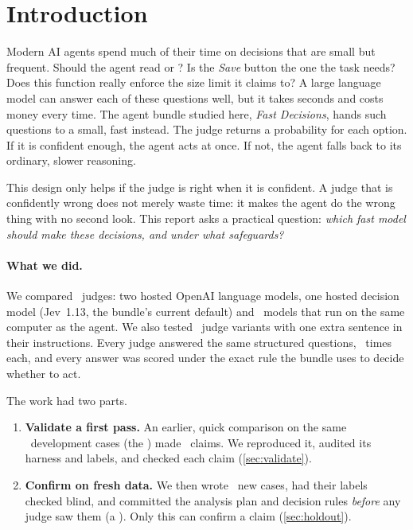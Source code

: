 \section{Introduction}\label{sec:intro}

Modern AI agents spend much of their time on decisions that are small but frequent. Should the agent
read  or ? Is the \emph{Save} button the one the task needs?
Does this function really enforce the size limit it claims to? A large language model can answer each
of these questions well, but it takes seconds and costs money every time. The agent bundle studied here,
\emph{Fast Decisions}, hands such questions to a small, fast  instead. The judge
returns a probability for each option. If it is confident enough, the agent acts at once. If not, the
agent falls back to its ordinary, slower reasoning.

This design only helps if the judge is right when it is confident. A judge that is confidently wrong
does not merely waste time: it makes the agent do the wrong thing with no second look. This report asks
a practical question: \emph{which fast model should make these decisions, and under what safeguards?}

\paragraph{What we did.} We compared \NumBase\ judges: two hosted OpenAI language models, one hosted
decision model (Jev~1.13, the bundle's current default) and \NumLocal\ models that run on the same
computer as the agent. We also tested \NumClauseArms\ judge variants with one extra sentence in their
instructions. Every judge answered the same structured questions, \DevReps\ times each, and every
answer was scored under the exact rule the bundle uses to decide whether to act.

The work had two parts.
\begin{enumerate}
  \item \textbf{Validate a first pass.} An earlier, quick comparison on the same \DevN\ development
    cases (the ) made \ChangesN\ claims. We reproduced it, audited its harness and
    labels, and checked each claim (\cref{sec:validate}).
  \item \textbf{Confirm on fresh data.} We then wrote \HoldN\ new cases, had their labels checked blind,
    and committed the analysis plan and decision rules \emph{before} any judge saw them
    (a ). Only this  can confirm a claim (\cref{sec:holdout}).
\end{enumerate}

